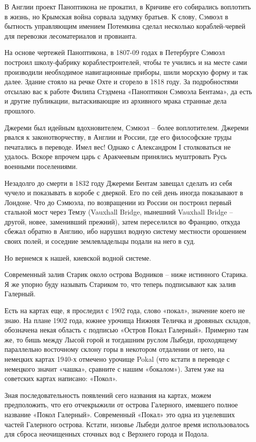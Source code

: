 В Англии проект Паноптикона не прокатил, в Кричиве его собирались воплотить в жизнь, но Крымская война сорвала задумку братьев. К слову, Сэмюэл в бытность управляющим имением Потемкина сделал несколько кораблей-червей для перевозки лесоматериалов и провианта.

На основе чертежей Паноптикона, в 1807-09 годах в Петербурге Сэмюэл построил школу-фабрику кораблестроителей, чтобы те учились и на месте сами производили необходимое навигационные приборы, шили морскую форму и так далее. Здание стояло на речке Охте и сгорело в 1818 году. За подробностями отсылаю вас к работе Филипа Стэдмена «Паноптикон Сэмюэла Бентама»\cite{panoptikon}, да есть и другие публикации, вытаскивающие из архивного мрака странные дела прошлого.

Джереми был идейным вдохновителем, Сэмюэл – более воплотителем. Джереми рвался к законотворчеству, в Англии и России, где его философские труды печатались в переводе. Имел вес! Однако с Александром I столковаться не удалось. Вскоре впрочем царь с Аракчеевым принялись муштровать Русь военными поселениями.

Незадолго до смерти в 1832 году Джереми Бентам завещал сделать из себя чучело и показывать в коробе с дверкой. Его по сей день иногда показывают в Лондоне. Что до Сэмюэла, по возвращении из России он построил первый стальной мост через Темзу (Vauxhall Bridge, нынешний Vauxhall Bridge – другой, новее, заменивший прежний), затем переселился во Францию, откуда сбежал обратно в Англию, ибо нарушил водную систему местности орошением своих полей, и соседние землевладельцы подали на него в суд.

Но вернемся к нашей, киевской водной системе. 

Современный залив Старик около острова Водников – ниже истинного Старика. Я же упорно буду называть Стариком то, что теперь подписывают как залив Галерный.

Есть на картах еще, я проследил с 1902 года, слово «покал», значение коего не знаю. На плане 1902 года, южнее урочища Нижняя Теличка и дровяных складов, обозначена некая область с подписью «Остров Покал Галерный». Примерно там же, то бишь между Лысой горой и тогдашним руслом Лыбеди, проходящему параллельно восточному склону горы в некотором отдалении от него, на немецких картах 1940-х отмечено урочище Pokal (что кстати в переводе с немецкого значит «чашка», сравните с нашим «бокалом»). Затем уже на советских картах написано: «Покол».

Зная последовательность появлений сего названия на картах, можем предположить, что его отчекрыжили от острова Галерного, имевшего полное название «Покол Галерный». Современный «Покал» это одна из уцелевших частей Галерного острова. Кстати, низовье Лыбеди долгое время использовалось для сброса неочищенных сточных вод с Верхнего города и Подола.

